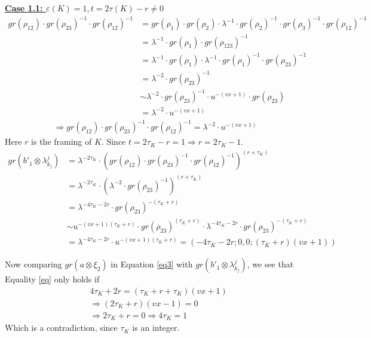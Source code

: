 \documentclass[11pt,reqno]{amsart}
\theoremstyle{definition}
\newtheorem *{remark}{Remark}
\begin{document}
\begin{subsection}{\underline{\textbf{Case 1.1: $\varepsilon(K)=1, t = 2 \tau(K) - r \neq 0$}}}
\begin{align*}
    gr(\rho_{12})\cdot gr(\rho_{23})^{-1} \cdot gr(\rho_{12})^{-1} &= gr(\rho_1) \cdot gr(\rho_2)\cdot \lambda^{-1} \cdot gr(\rho_2)^{-1}\cdot gr(\rho_3)^{-1}\cdot gr(\rho_{12})^{-1}\\
    &= \lambda^{-1} \cdot gr(\rho_1) \cdot gr(\rho_{123})^{-1}\\
    &= \lambda^{-1} \cdot gr(\rho_1)\cdot \lambda^{-1} \cdot gr(\rho_1)^{-1}\cdot gr(\rho_{23})^{-1}\\
    &=\lambda^{-2} \cdot gr(\rho_{23})^{-1}\\
    & \sim \lambda^{-2} \cdot gr(\rho_{23})^{-1} \cdot u^{-(vx+1)} \cdot gr(\rho_{23})\\
    &= \lambda^{-2} \cdot u^{-(vx+1)}
\end{align*}
\begin{align}
\label{eq4}
  \Rightarrow gr(\rho_{12})\cdot gr(\rho_{23})^{-1} \cdot gr(\rho_{12})^{-1} =   \lambda^{-2} \cdot u^{-(vx+1)}
\end{align}
Here $r$ is the framing of $K$. Since $t = 2\tau_K - r =1 \Rightarrow r = 2\tau_K-1$. 
\begin{align*}
   gr(b'_1 \otimes \lambda^j_{k_j})&=\lambda^{-2\tau_K}\cdot(gr(\rho_{12})\cdot gr(\rho_{23})^{-1} \cdot gr(\rho_{12})^{-1})^{(r+\tau_K)}\\
   &= \lambda^{-2\tau_K} \cdot (\lambda^{-2} \cdot gr(\rho_{23})^{-1})^{(r+\tau_K)}\\
   &= \lambda^{-4\tau_K-2r}\cdot gr(\rho_{23})^{-(\tau_K+r)}\\
   &\sim u^{-(vx+1)(\tau_K+r)}\cdot gr(\rho_{23})^{(\tau_K+r)} \cdot \lambda^{-4\tau_K-2r}\cdot gr(\rho_{23})^{-(\tau_K+r)}\\
   &= \lambda^{-4\tau_K-2r} \cdot u^{-(vx+1)(\tau_K+r)}= (-4\tau_K-2r;0,0;(\tau_K+r)(vx+1))
\end{align*}


Now comparing $gr(a\otimes \xi_2)$ in Equation \ref{eq3} with $gr(b'_1 \otimes \lambda^j_{k_j})$, we see that Equality \ref{eq} only holds if 
\begin{align*}
    &4\tau_K+2r= (\tau_K+r + \tau_K)(vx+1)\\
    &\Rightarrow (2\tau_K+r)(vx-1) = 0\\ 
   &\Rightarrow 2\tau_K+r = 0 \Rightarrow 4\tau_K = 1
\end{align*}
Which is a contradiction, since $\tau_K$ is an integer.
\end{subsection}


\end{document}
